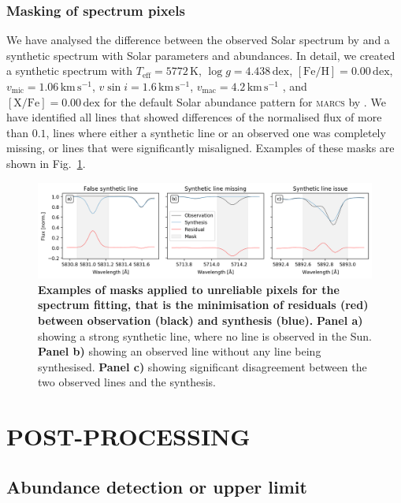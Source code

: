 \documentclass[
  journal=pasa,
  manuscript=research-paper, %
  year=2021,
  volume=37,
]{cup-journal}
\newcommand{\marcs}{\textsc{marcs}\xspace}
\newcommand{\dex}{\,\mathrm{dex}}	%
\newcommand{\K}{\,\mathrm{K}}	%
\newcommand{\kms}{\,\mathrm{km\,s^{-1}}}	%
\begin{document}
\subsubsection{Masking of spectrum pixels}

We have analysed the difference between the observed Solar spectrum by \citet{Hinkle2000} and a synthetic spectrum with Solar parameters and abundances. In detail, we created a synthetic spectrum with $T_\text{eff} = 5772\K$, $\log g = 4.438\dex$, $\mathrm{[Fe/H]} = 0.00\dex$, $v_\text{mic} = 1.06\kms$, $v \sin i = 1.6\kms$, $v_\text{mac} = 4.2\kms$ \citep{Prsa2016, Jofre2017}, and $\mathrm{[X/Fe]} = 0.00\dex$ for the default Solar abundance pattern for \marcs by \citet{Grevesse2007}. We have identified all lines that showed differences of the normalised flux of more than $0.1$, lines where either a synthetic line or an observed one was completely missing, or lines that were significantly misaligned. Examples of these masks are shown in Fig.~\ref{fig:example_masking_sun}.

\begin{figure}[hbt!]
 \centering  
 \includegraphics[width=\textwidth]{figures/example_masking_sun.png}
\caption{\textbf{Examples of masks applied to unreliable pixels for the spectrum fitting, that is the minimisation of residuals (red) between observation (black) and synthesis (blue).} \textbf{Panel a)} showing a strong synthetic line, where no line is observed in the Sun. \textbf{Panel b)} showing an observed line without any line being synthesised. \textbf{Panel c)} showing significant disagreement between the two observed lines and the synthesis.} \label{fig:example_masking_sun}
\end{figure}

\newpage
\section{POST-PROCESSING} \label{sec:post_processing}

\subsection{Abundance detection or upper limit}
\end{document}

